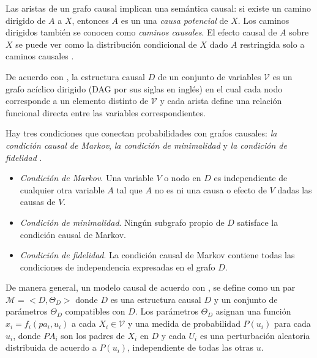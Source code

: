 Las aristas de un grafo causal implican una semántica causal: si existe un camino dirigido de $A$ a $X$, entonces $A$ es un una \textit{causa potencial} de $X$. Los caminos dirigidos también se conocen como \textit{caminos causales}. El efecto causal de $A$ sobre $X$ se puede ver como la distribución condicional de $X$ dado $A$ restringida solo a caminos causales \cite{dasgupta2019causal}.

De acuerdo con \cite{pearl_2009}, la estructura causal $D$ de un conjunto de variables $\mathcal{V}$ es un grafo acíclico dirigido (DAG por sus siglas en inglés) en el cual cada nodo corresponde a un elemento distinto de $\mathcal{V}$ y cada arista define una relación funcional directa entre las
variables correspondientes. 

Hay tres condiciones que conectan probabilidades con
grafos causales: \textit{la condición causal de Markov}, \textit{la condición de minimalidad} y \textit{la condición
de fidelidad} \cite{gonzalez-soto, spirtes2000causation}.

\begin{itemize}
    \item \textit{Condición de Markov}. Una variable $V$ o nodo
    en $D$ es independiente de cualquier otra variable $A$ tal que
    $A$ no es ni una causa o efecto de $V$ dadas las causas de $V$.
    \item \textit{Condición de minimalidad}. Ningún subgrafo propio de $D$ satisface la condición causal de Markov.
    \item \textit{Condición de fidelidad}. La condición causal de Markov contiene todas las condiciones de independencia expresadas en el grafo $D$.
\end{itemize}

De manera general, un modelo causal de acuerdo con \cite{pearl_2009}, se define como un par $\mathcal{M} = <D, \Theta_D>$ donde $D$
es una estructura causal 
$D$ y un conjunto de 
parámetros $\Theta_D$ compatibles con $D$. Los 
parámetros $\Theta_D$ asignan una función $x_i = f_i (pa_i, u_i)$ a cada $X_i \in\mathcal{V}$
y una medida de  probabilidad  $P(u_i)$ para cada $u_i$, donde $PA_i$ son 
los padres de $X_i$ en $D$ y cada $U_i$ es una perturbación aleatoria distribuida
de acuerdo a $P(u_i)$, independiente de todas las otras $u$.
    
